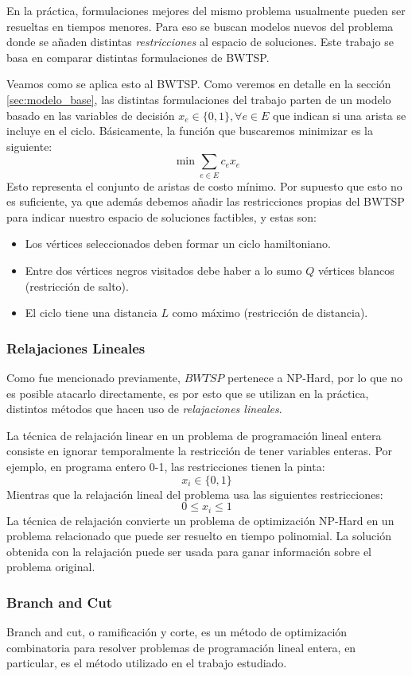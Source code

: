 \documentclass[10pt, a4paper]{article}
\theoremstyle{definition}
\begin{document}
En la práctica, formulaciones mejores del mismo problema usualmente pueden ser resueltas en tiempos menores. Para eso se buscan modelos nuevos del problema donde se añaden distintas \textit{restricciones} al espacio de soluciones. Este trabajo se basa en comparar distintas formulaciones de BWTSP.

Veamos como se aplica esto al BWTSP. Como veremos en detalle en la sección \ref{sec:modelo_base}, las distintas formulaciones del trabajo parten de un modelo basado en las variables de decisión $x_e \in \{0,1\}, \forall e \in E$ que indican si una arista se incluye en el ciclo. Básicamente, la función que buscaremos minimizar es la siguiente:
$$\min \sum_{e \in E} c_{e} x_{e}$$
Esto representa el conjunto de aristas de costo mínimo. Por supuesto que esto no es suficiente, ya que además debemos añadir las restricciones propias del BWTSP para indicar nuestro espacio de soluciones factibles, y estas son:
\begin{itemize}
  \item Los vértices seleccionados deben formar un ciclo hamiltoniano.
  \item Entre dos vértices negros visitados debe haber a lo sumo $Q$ vértices blancos (restricción de salto).
  \item El ciclo tiene una distancia $L$ como máximo (restricción de distancia).
\end{itemize} 

\subsubsection{Relajaciones Lineales}
Como fue mencionado previamente, $BWTSP$ pertenece a NP-Hard, por lo que no es posible atacarlo directamente, es por esto que se utilizan en la práctica, distintos métodos que hacen uso de \textit{relajaciones lineales}.

La técnica de relajación linear en un problema de programación lineal entera consiste en ignorar temporalmente la restricción de tener variables enteras. Por ejemplo, en programa entero 0-1, las restricciones tienen la pinta:
$$x_i \in \{0,1\}$$
Mientras que la relajación lineal del problema usa las siguientes restricciones:
$$0 \leq x_i \leq 1$$
La técnica de relajación convierte un problema de optimización NP-Hard en un problema relacionado que puede ser resuelto en tiempo polinomial. La solución obtenida con la relajación puede ser usada para ganar información sobre el problema original. 


\subsubsection{Branch and Cut}
Branch and cut, o ramificación y corte, es un método de optimización combinatoria para resolver problemas de programación lineal entera, en particular, es el método utilizado en el trabajo estudiado.
\end{document}
